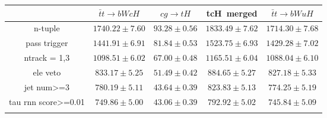 \begin{tabular}{ccccc} \toprule\toprule
 & $\bar{t}t\to bWcH$ & $cg\to tH$ & tcH~merged & $\bar{t}t\to bWuH$\\\midrule
n-tuple & $1740.22\pm7.60$ & $93.28\pm0.56$ & $1833.49\pm7.62$ & $1714.30\pm7.68$\\
pass trigger & $1441.91\pm6.91$ & $81.84\pm0.53$ & $1523.75\pm6.93$ & $1429.28\pm7.02$\\
ntrack = 1,3 & $1098.51\pm6.02$ & $67.00\pm0.48$ & $1165.51\pm6.04$ & $1088.04\pm6.10$\\
ele veto & $833.17\pm5.25$ & $51.49\pm0.42$ & $884.65\pm5.27$ & $827.18\pm5.33$\\
jet num>=3 & $780.19\pm5.11$ & $43.64\pm0.39$ & $823.83\pm5.13$ & $774.25\pm5.19$\\
tau rnn score>=0.01 & $749.86\pm5.00$ & $43.06\pm0.39$ & $792.92\pm5.02$ & $745.84\pm5.09$\\
\bottomrule\bottomrule\\
\end{tabular}
